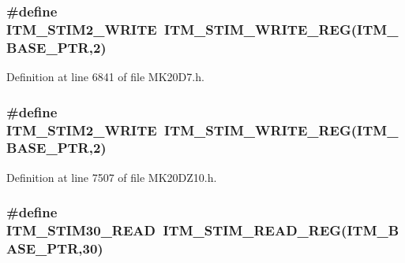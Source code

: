 \subsubsection[{\texorpdfstring{I\+T\+M\+\_\+\+S\+T\+I\+M2\+\_\+\+W\+R\+I\+TE}{ITM_STIM2_WRITE}}]{\setlength{\rightskip}{0pt plus 5cm}\#define I\+T\+M\+\_\+\+S\+T\+I\+M2\+\_\+\+W\+R\+I\+TE~{\bf I\+T\+M\+\_\+\+S\+T\+I\+M\+\_\+\+W\+R\+I\+T\+E\+\_\+\+R\+EG}({\bf I\+T\+M\+\_\+\+B\+A\+S\+E\+\_\+\+P\+TR},2)}\hypertarget{group___i_t_m___register___accessor___macros_gaef5fd73197cf69307c400cd33e9d5c0a}{}\label{group___i_t_m___register___accessor___macros_gaef5fd73197cf69307c400cd33e9d5c0a}


Definition at line 6841 of file M\+K20\+D7.\+h.

\subsubsection[{\texorpdfstring{I\+T\+M\+\_\+\+S\+T\+I\+M2\+\_\+\+W\+R\+I\+TE}{ITM_STIM2_WRITE}}]{\setlength{\rightskip}{0pt plus 5cm}\#define I\+T\+M\+\_\+\+S\+T\+I\+M2\+\_\+\+W\+R\+I\+TE~{\bf I\+T\+M\+\_\+\+S\+T\+I\+M\+\_\+\+W\+R\+I\+T\+E\+\_\+\+R\+EG}({\bf I\+T\+M\+\_\+\+B\+A\+S\+E\+\_\+\+P\+TR},2)}\hypertarget{group___i_t_m___register___accessor___macros_gaef5fd73197cf69307c400cd33e9d5c0a}{}\label{group___i_t_m___register___accessor___macros_gaef5fd73197cf69307c400cd33e9d5c0a}


Definition at line 7507 of file M\+K20\+D\+Z10.\+h.

\subsubsection[{\texorpdfstring{I\+T\+M\+\_\+\+S\+T\+I\+M30\+\_\+\+R\+E\+AD}{ITM_STIM30_READ}}]{\setlength{\rightskip}{0pt plus 5cm}\#define I\+T\+M\+\_\+\+S\+T\+I\+M30\+\_\+\+R\+E\+AD~{\bf I\+T\+M\+\_\+\+S\+T\+I\+M\+\_\+\+R\+E\+A\+D\+\_\+\+R\+EG}({\bf I\+T\+M\+\_\+\+B\+A\+S\+E\+\_\+\+P\+TR},30)}\hypertarget{group___i_t_m___register___accessor___macros_ga24e46238f0f743da6b080a2cbb500ff5}{}\label{group___i_t_m___register___accessor___macros_ga24e46238f0f743da6b080a2cbb500ff5}


